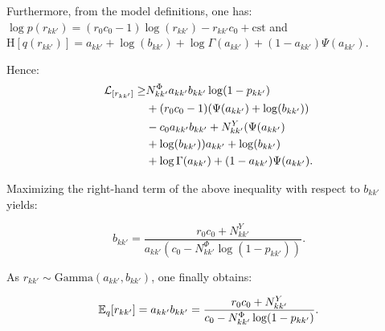 Furthermore, from the model definitions, one has: $\log p(r_{kk'}) = (r_0 c_0-1)\log(r_{kk'}) - r_{kk'} c_0 + \mathrm{cst}$  and $\textrm{H}[q(r_{kk'})] = a_{kk'} + \log(b_{kk'}) +\log \Gamma(a_{kk'}) + (1-a_{kk'})\Psi(a_{kk'})$.

Hence:
%
\begin{align*}
\mathcal{L}_{[r_{kk'}]} \geq & N^\Phi_{kk'} a_{kk'} b_{kk'} \log(1-p_{kk'}) \\
& + (r_0 c_0-1 )(\Psi(a_{kk'}) + \log(b_{kk'})) \\
& - c_0 a_{kk'} b_{kk'} + N^Y_{kk'} (\Psi(a_{kk'}) \\
& + \log(b_{kk'}))  a_{kk'} + \log(b_{kk'}) \\
& + \log \Gamma(a_{kk'}) + (1-a_{kk'})\Psi(a_{kk'}).
\end{align*}

Maximizing the right-hand term of the above inequality with respect to $b_{kk'}$ yields:

\begin{equation} \label{eq:update2}
b_{kk'} = \frac{r_0 c_0 + N^Y_{kk'}}{a_{kk'} (c_0 - N^\Phi_{kk'} \log(1-p_{kk'}))}. \nonumber
\end{equation}

As $r_{kk'} \sim \textrm{Gamma}(a_{kk'},b_{kk'})$, one finally obtains:

\begin{equation}
\mathbb{E}_q[r_{kk'}] = a_{kk'} b_{kk'} = \frac{r_0 c_0 + N^Y_{kk'}}{c_0 - N^\Phi_{kk'} \log(1-p_{kk'})}. \nonumber
\end{equation}


